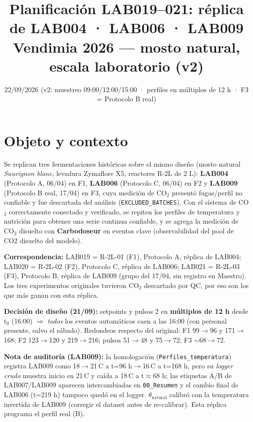 \documentclass[10pt,landscape]{article}
\title{\textcolor{prim}{Planificación LAB019--021: réplica de LAB004 · LAB006 · LAB009}\\[2pt]\large Vendimia 2026 --- mosto natural, escala laboratorio (v2)}
\author{}
\date{22/09/2026 (v2: muestreo 09:00/12:00/15:00 · perfiles en múltiplos de 12 h · F3 = Protocolo B real)}
\begin{document}
\maketitle
\thispagestyle{empty}
\vspace{-1.2cm}

\section{Objeto y contexto}
Se replican tres fermentaciones históricas sobre el mismo diseño (mosto natural \emph{Sauvignon blanc}, levadura Zymaflore X5, reactores R-2L de 2 L): \textbf{LAB004} (Protocolo A, 06/04) en F1, \textbf{LAB006} (Protocolo C, 06/04) en F2 y \textbf{LAB009} (Protocolo B real, 17/04) en F3, cuya medición de CO$_2$ presentó fugas/perfil no confiable y fue descartada del análisis (\texttt{EXCLUDED\_BATCHES}). Con el sistema de CO$_2$ correctamente conectado y verificado, se repiten los perfiles de temperatura y nutrición para obtener una serie continua confiable, y se agrega la medición de CO$_2$ disuelto con \textbf{Carbodoseur} en eventos clave (observabilidad del pool de CO2 disuelto del modelo).

\textbf{Correspondencia:} LAB019 = R-2L-01 (F1), Protocolo A, réplica de LAB004; LAB020 = R-2L-02 (F2), Protocolo C, réplica de LAB006; LAB021 = R-2L-03 (F3), Protocolo B, réplica de LAB009 (grupo del 17/04, sin registro en Maestro). Los tres experimentos originales tuvieron CO$_2$ descartado por QC, por eso son los que más ganan con esta réplica.

\textbf{Decisión de diseño (21/09):} setpoints y pulsos 2 en \textbf{múltiplos de 12 h} desde t$_0$ (16:00) $\Rightarrow$ \emph{todos} los eventos automáticos caen a las 16:00 (con personal presente, salvo el sábado). Redondeos respecto del original: F1 99$\rightarrow$96 y 171$\rightarrow$168; F2 123$\rightarrow$120 y 219$\rightarrow$216; pulsos 51$\rightarrow$48 y 75$\rightarrow$72; F3 $\sim$68$\rightarrow$72.

\textbf{Nota de auditoría (LAB009):} la homologación (\texttt{Perfiles\_temperatura}) registra LAB009 como 18$\rightarrow$21\,\textdegree C a t=96 h$\rightarrow$16\,\textdegree C a t=168 h, pero su \emph{logger crudo} muestra inicio en 21\,\textdegree C y caída a 18\,\textdegree C a t$\approx$68 h; las etiquetas A/B de LAB007/LAB009 aparecen intercambiadas en \texttt{00\_Resumen} y el cambio final de LAB006 (t=219 h) tampoco quedó en el logger. $\theta_{\text{natural}}$ calibró con la temperatura invertida de LAB009 (corregir el dataset antes de re-calibrar). Esta réplica programa el perfil real (B).
\end{document}
